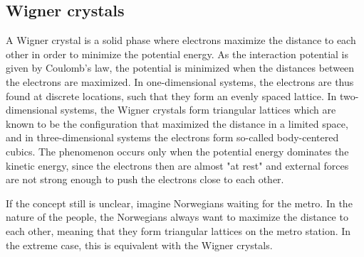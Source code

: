 \subsection{Wigner crystals} \label{sec:wigner}
A Wigner crystal is a solid phase where electrons maximize the distance to each other in order to minimize the potential energy. As the interaction potential is given by Coulomb's law, the potential is minimized when the distances between the electrons are maximized. In one-dimensional systems, the electrons are thus found at discrete locations, such that they form an evenly spaced lattice. In two-dimensional systems, the Wigner crystals form triangular lattices which are known to be the configuration that maximized the distance in a limited space, and in three-dimensional systems the electrons form so-called body-centered cubics. The phenomenon occurs only when the potential energy dominates the kinetic energy, since the electrons then are almost "at rest" and external forces are not strong enough to push the electrons close to each other. 

If the concept still is unclear, imagine Norwegians waiting for the metro. In the nature of the people, the Norwegians always want to maximize the distance to each other, meaning that they form triangular lattices on the metro station. In the extreme case, this is equivalent with the Wigner crystals. 


